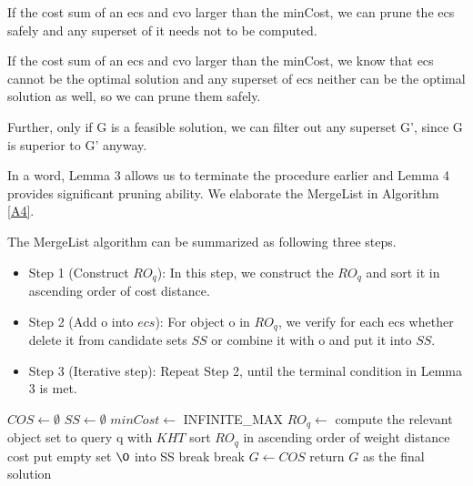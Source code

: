 \begin{lem}
    If the cost sum of an ecs and cvo larger than the minCost, we can prune the ecs safely and any superset of it needs not to be computed.
    \begin{pot}
        If the cost sum of an ecs and cvo larger than the minCost, we know that ecs cannot be the optimal solution and any superset of ecs neither can be the optimal solution as well, so we can prune them safely.
    \end{pot}
\end{lem} \label{L6}

Further, only if G is a feasible solution, we can filter out any superset G', since G is superior to G' anyway.

In a word, Lemma 3 allows us to terminate the procedure earlier and Lemma 4 provides significant pruning ability. We elaborate the MergeList in Algorithm \ref{A4}.

The MergeList algorithm can be summarized as following three steps.
\begin{itemize}
    \item Step 1 (Construct $RO_q$): In this step, we construct the $RO_q$ and sort it in ascending order of cost distance.
    \item Step 2 (Add o into $ecs$): For object o in $RO_q$, we verify for each ecs whether delete it from candidate sets $SS$ or combine it with o and put it into $SS$.
    \item Step 3 (Iterative step): Repeat Step 2, until the terminal condition in Lemma 3 is met.
\end{itemize}

\IncMargin{1em}
\begin{algorithm}[!hb]
\caption{$MergeList$} \label{A4}   %
{}
\BlankLine
\LinesNumbered
$COS \longleftarrow \emptyset$\;
$SS \longleftarrow \emptyset$\;
$minCost \longleftarrow$ INFINITE\_MAX\;
$RO_q \longleftarrow$ compute the relevant object set to query q with $KHT$\;
sort $RO_q$ in ascending order of weight distance cost\;
put empty set ${\O}$ into SS\;
 {
     {
        break\;
    }
     {
        break\;
    }
}
$G \longleftarrow COS$\;
return $G$ as the final solution\;
\end{algorithm}
\DecMargin{1em}

